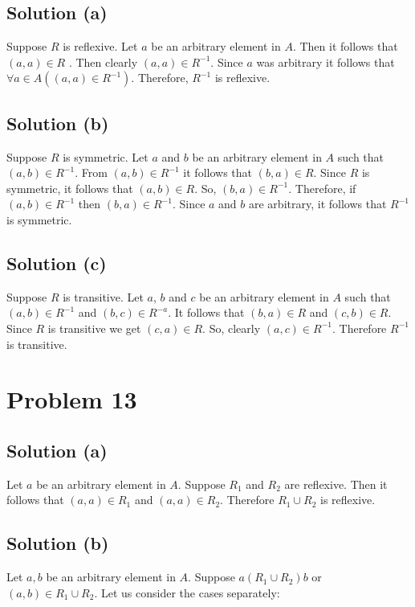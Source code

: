\documentclass{article}
\begin{document}
\subsection{Solution (a)}
Suppose $R$ is reflexive. Let $a$ be an arbitrary element in $A$. Then
it follows that $(a,a) \in R$ . Then clearly $(a,a) \in R^{-1}$. Since
$a$ was arbitrary it follows that $\forall a \in A((a,a) \in R^{-1})$.
Therefore, $R^{-1}$ is reflexive.

\subsection{Solution (b)}
Suppose $R$ is symmetric. Let $a$ and $b$ be an arbitrary element in
$A$ such that $(a,b) \in R^{-1}$. From $(a,b) \in R^{-1}$ it follows
that $(b,a) \in R$. Since $R$ is symmetric, it follows that $(a,b) \in
R$. So, $(b,a) \in R^{-1}$. Therefore, if $(a,b) \in R^{-1}$ then
$(b,a) \in R^{-1}$. Since $a$ and $b$ are arbitrary, it follows that
$R^{-1}$ is symmetric.

\subsection{Solution (c)}
Suppose $R$ is transitive. Let $a$, $b$ and $c$ be an arbitrary
element in $A$ such that $(a,b) \in R^{-1}$ and $(b,c) \in R^{-a}$. It
follows that $(b,a) \in R$ and $(c,b) \in R$. Since $R$ is transitive
we get $(c,a) \in R$. So, clearly $(a,c) \in R^{-1}$. Therefore
$R^{-1}$ is transitive.

\section{Problem 13}

\subsection{Solution (a)}

Let $a$ be an arbitrary element in $A$. Suppose $R_1$ and $R_2$ are
reflexive. Then it follows that $(a,a) \in R_1$ and $(a,a) \in R_2$.
Therefore $R_1 \cup R_2$ is reflexive.

\subsection{Solution (b)}

Let $a, b$ be an arbitrary element in $A$. Suppose $a (R_1 \cup R_2)b$
or $(a,b) \in R_1 \cup R_2$. Let us consider the cases separately:
\end{document}
